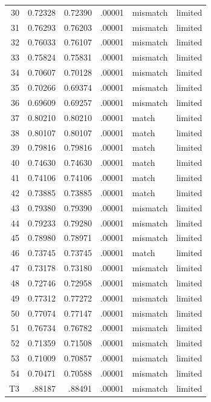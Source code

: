\documentclass[11pt]{article}
\begin{document}
\begin{longtable}{rrrrll}
30&0.72328&0.72390&.00001&mismatch&limited\\
31&0.76293&0.76203&.00001&mismatch&limited\\
32&0.76033&0.76107&.00001&mismatch&limited\\
33&0.75824&0.75831&.00001&mismatch&limited\\
34&0.70607&0.70128&.00001&mismatch&limited\\
35&0.70266&0.69374&.00001&mismatch&limited\\
36&0.69609&0.69257&.00001&mismatch&limited\\
37&0.80210&0.80210&.00001&match&limited\\
38&0.80107&0.80107&.00001&match&limited\\
39&0.79816&0.79816&.00001&match&limited\\
40&0.74630&0.74630&.00001&match&limited\\
41&0.74106&0.74106&.00001&match&limited\\
42&0.73885&0.73885&.00001&match&limited\\
43&0.79380&0.79390&.00001&mismatch&limited\\
44&0.79233&0.79280&.00001&mismatch&limited\\
45&0.78980&0.78971&.00001&mismatch&limited\\
46&0.73745&0.73745&.00001&match&limited\\
47&0.73178&0.73180&.00001&mismatch&limited\\
48&0.72746&0.72958&.00001&mismatch&limited\\
49&0.77312&0.77272&.00001&mismatch&limited\\
50&0.77074&0.77147&.00001&mismatch&limited\\
51&0.76734&0.76782&.00001&mismatch&limited\\
52&0.71359&0.71508&.00001&mismatch&limited\\
53&0.71009&0.70857&.00001&mismatch&limited\\
54&0.70471&0.70588&.00001&mismatch&limited\\
T3&.88187&.88491&.00001&mismatch&limited\\
\bottomrule\end{longtable}\normalsize
\end{document}
